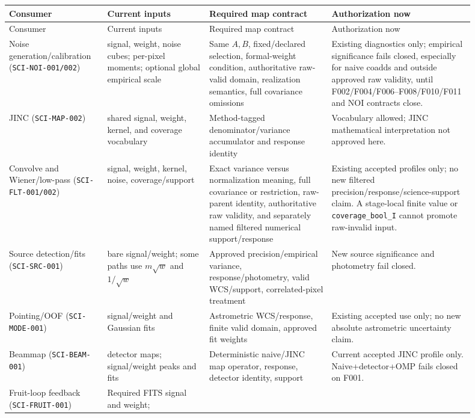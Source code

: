 \documentclass[11pt]{article}
\newcommand{\code}[1]{\nolinkurl{#1}}
\begin{document}
\begin{longtable}{L{0.18\linewidth}L{0.20\linewidth}L{0.24\linewidth}L{0.28\linewidth}}
\toprule
Consumer & Current inputs & Required map contract & Authorization now\\
\midrule
\endfirsthead
\toprule
Consumer & Current inputs & Required map contract & Authorization now\\
\midrule
\endhead
Noise generation/calibration
(\code{SCI-NOI-001/002}) & signal, weight, noise cubes; per-pixel moments;
optional global empirical scale & Same \(A,B\), fixed/declared selection,
formal-weight condition, authoritative raw-valid domain, realization semantics,
full covariance omissions & Existing diagnostics only; empirical significance
fails closed, especially for naive coadds and outside approved raw validity,
until F002/F004/F006--F008/F010/F011 and NOI contracts close.\\
JINC (\code{SCI-MAP-002}) & shared signal, weight, kernel, and coverage vocabulary &
Method-tagged denominator/variance accumulator and response identity &
Vocabulary allowed; JINC mathematical interpretation not approved here.\\
Convolve and Wiener/low-pass (\code{SCI-FLT-001/002}) & signal, weight,
kernel, noise, coverage/support & Exact variance versus normalization meaning,
full covariance or restriction, raw-parent identity, authoritative raw validity,
and separately named filtered numerical support/response & Existing accepted
profiles only; no new filtered precision/response/science-support claim.  A
stage-local finite value or \code{coverage_bool_I} cannot promote raw-invalid
input.\\
Source detection/fits (\code{SCI-SRC-001}) & bare signal/weight; some paths
use \(m\sqrt w\) and \(1/\sqrt w\) & Approved precision/empirical variance,
response/photometry, valid WCS/support, correlated-pixel treatment & New source
significance and photometry fail closed.\\
Pointing/OOF (\code{SCI-MODE-001}) & signal/weight and Gaussian fits &
Astrometric WCS/response, finite valid domain, approved fit weights & Existing
accepted use only; no new absolute astrometric uncertainty claim.\\
Beammap (\code{SCI-BEAM-001}) & detector maps; signal/weight peaks and fits &
Deterministic naive/JINC map operator, response, detector identity, support &
Current accepted JINC profile only.  Naive+detector+OMP fails closed on F001.\\
Fruit-loop feedback (\code{SCI-FRUIT-001}) & Required FITS signal and weight;

\end{longtable}
\end{document}
